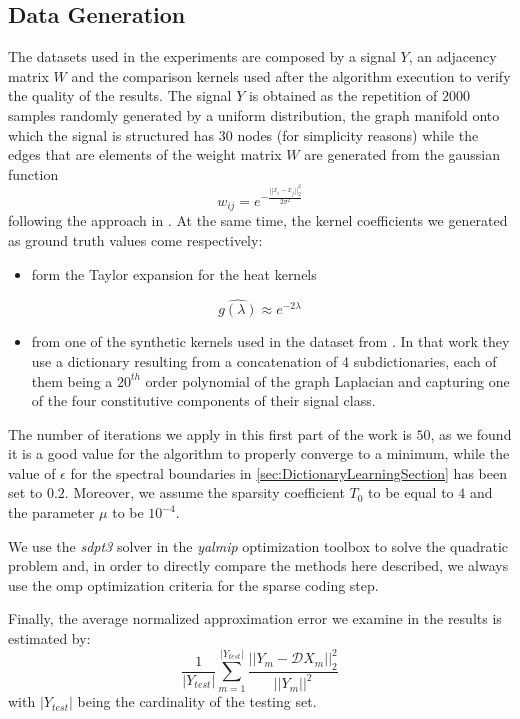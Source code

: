 \subsection{Data Generation}
The datasets used in the experiments are composed by a signal $Y$, an adjacency matrix $W$ and the comparison kernels used after the algorithm execution to verify the quality of the results. The signal $Y$ is obtained as the repetition of $2000$ samples randomly generated by a uniform distribution, the graph manifold onto which the signal is structured has $30$ nodes (for simplicity reasons) while the edges that are elements of the weight matrix $W$ are generated from the gaussian function
\begin{equation}
  w_{ij} = e^{-\frac{||x_i - x_j||_2^2}{2\sigma^2}}
\end{equation}
following the approach in \cite{Kalofolias2016}. At the same time, the kernel coefficients we generated as ground truth values come respectively:
\begin{itemize}
  \item form the Taylor expansion for the heat kernels
\end{itemize}
\begin{equation}
  \hat{g(\lambda)} \approx e^{-2\lambda}
\end{equation}
\begin{itemize}
  \item from one of the synthetic kernels used in the dataset from \cite{Thanou2014}. In that work they use a dictionary resulting from a concatenation of 4 subdictionaries, each of them being a $20^{th}$ order polynomial of the graph Laplacian and capturing one of the four constitutive components of their signal class.
\end{itemize}

The number of iterations we apply in this first part of the work is $50$, as we found it is a good value for the algorithm to properly converge to a minimum, while the value of $\epsilon$ for the spectral boundaries in \autoref{sec:DictionaryLearningSection} has been set to $0.2$. Moreover, we assume the sparsity coefficient $T_0$ to be equal to $4$ and the parameter $\mu$ to be $10^{-4}$.

We use the \textit{sdpt3} solver in the \textit{yalmip} optimization toolbox to solve the quadratic problem and, in order to directly compare the methods here described, we always use the \gls{omp} optimization criteria for the sparse coding step.

Finally, the average normalized approximation error we examine in the results is estimated by:
\begin{equation}
  \frac{1}{|Y_{test}|}\sum_{m=1}^{|Y_{test}|}\frac{||Y_m - \mathcal{D}X_m||_2^2}{||Y_m||^2}
\end{equation}
with $|Y_{test}|$ being the cardinality of the testing set.

